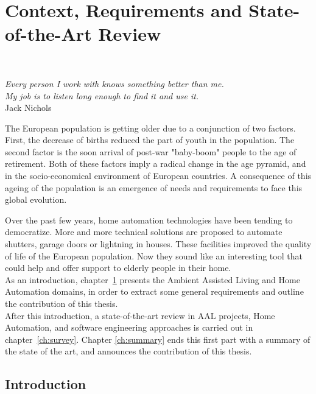 \part{Context, Requirements and State-of-the-Art Review}


~\vspace{1cm}
\begin{flushright}
{\it Every person I work with knows something better than me.\\
My job is to listen long enough to find it and use it.}\\
Jack Nichols
\end{flushright}
\vspace{2cm}

The European population is getting older due to a conjunction of two factors. First, the decrease of births reduced the part of youth in the population. The second factor is the soon arrival of post-war "baby-boom" people to the age of retirement. Both of these factors imply a radical change in the age pyramid, and in the socio-economical environment of European countries. A consequence of this ageing of the population is an emergence of needs and requirements to face this global evolution.
\par Over the past few years, home automation technologies have been tending to democratize. More and more technical solutions are proposed to automate shutters, garage doors or lightning in houses. These facilities improved the quality of life of the European population. Now they sound like an interesting tool that could help and offer support to elderly people in their home.\\

As an introduction, chapter~\ref{ch:introduction} presents the Ambient Assisted Living and Home Automation domains, in order to extract some general requirements and outline the contribution of this thesis.\\
After this introduction, a state-of-the-art review in AAL projects, Home Automation, and software engineering approaches is carried out in chapter~\ref{ch:survey}. 
Chapter \ref{ch:summary} ends this first part with a summary of the state of the art, and announces the contribution of this thesis.


\chapter{Introduction}
\label{ch:introduction}


